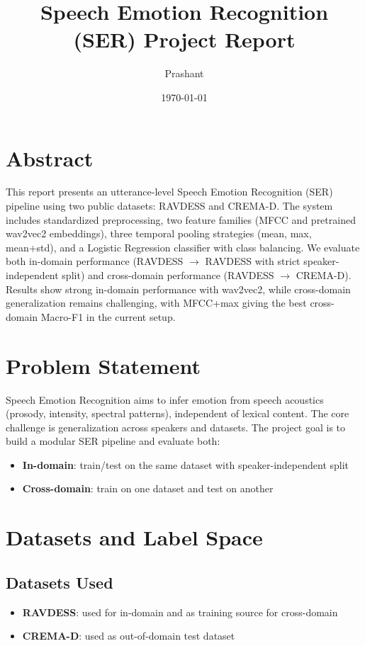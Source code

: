 \documentclass[11pt,a4paper]{article}
\title{Speech Emotion Recognition (SER) Project Report}
\author{Prashant}
\date{\today}
\begin{document}
\maketitle

\section{Abstract}
This report presents an utterance-level Speech Emotion Recognition (SER) pipeline using two public datasets: RAVDESS and CREMA-D. The system includes standardized preprocessing, two feature families (MFCC and pretrained wav2vec2 embeddings), three temporal pooling strategies (mean, max, mean+std), and a Logistic Regression classifier with class balancing. We evaluate both in-domain performance (RAVDESS $\rightarrow$ RAVDESS with strict speaker-independent split) and cross-domain performance (RAVDESS $\rightarrow$ CREMA-D). Results show strong in-domain performance with wav2vec2, while cross-domain generalization remains challenging, with MFCC+max giving the best cross-domain Macro-F1 in the current setup.

\section{Problem Statement}
Speech Emotion Recognition aims to infer emotion from speech acoustics (prosody, intensity, spectral patterns), independent of lexical content. The core challenge is generalization across speakers and datasets. The project goal is to build a modular SER pipeline and evaluate both:
\begin{itemize}
    \item \textbf{In-domain}: train/test on the same dataset with speaker-independent split
    \item \textbf{Cross-domain}: train on one dataset and test on another
\end{itemize}

\section{Datasets and Label Space}
\subsection{Datasets Used}
\begin{itemize}
    \item \textbf{RAVDESS}: used for in-domain and as training source for cross-domain
    \item \textbf{CREMA-D}: used as out-of-domain test dataset
\end{itemize}
\end{document}
